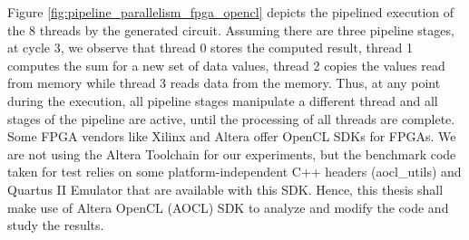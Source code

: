 Figure \ref{fig:pipeline_parallelism_fpga_opencl} depicts the pipelined execution of the 8 threads by the generated circuit. Assuming there are three pipeline stages, at cycle 3, we observe that thread 0 stores the computed result, thread 1 computes the sum for a new set of data values, thread 2 copies the values read from memory while thread 3 reads data from the memory. Thus, at any point during the execution, all pipeline stages manipulate a different thread and all stages of the pipeline are active, until the processing of all threads are complete. \newline \newline
Some FPGA vendors like Xilinx and Altera offer OpenCL SDKs for FPGAs. We are not using the Altera Toolchain for our experiments, but the benchmark code taken for test relies on some platform-independent C++ headers (aocl\_utils) and Quartus II Emulator that are available with this SDK. Hence, this thesis shall make use of Altera OpenCL (AOCL) SDK to analyze and modify the code and study the results.
